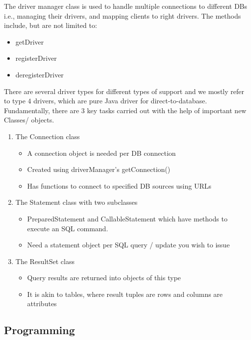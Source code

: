 \documentclass[a4paper]{article}
\theoremstyle{plain}
\theoremstyle{definition}
\theoremstyle{remark}
\begin{document}
\noindent The driver manager class is used to handle multiple connections to different DBs i.e., managing their drivers, and mapping clients to right drivers. The methods include, but are not limited to:
\begin{itemize}
	\item getDriver
	\item registerDriver
	\item deregisterDriver
\end{itemize}
There are several driver types for different types of support and we mostly refer to type $4$ drivers, which are pure Java driver for direct-to-database. Fundamentally, there are $3$ key tasks carried out with the help of important new Classes/ objects.
\begin{enumerate}
	\item The Connection class
		\begin{itemize}
			\item A connection object is needed per DB connection
			\item Created using driverManager's getConnection()
			\item Has functions to connect to specified DB sources using URLs
		\end{itemize}
	\item The Statement class with two subclasses
		\begin{itemize}
			\item PreparedStatement and CallableStatement which have methods to execute an SQL command.
			\item Need a statement object per SQL query / update you wish to issue
		\end{itemize}
	\item The ResultSet class
	\begin{itemize}
		\item Query results are returned into objects of this type
		\item It is akin to tables, where result tuples are rows and columns are attributes
	\end{itemize}
\end{enumerate}
\subsection{Programming}
\end{document}
